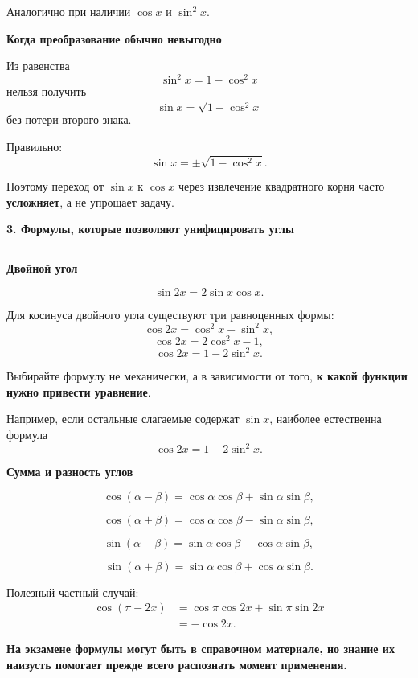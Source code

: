 \documentclass[a4paper,12pt]{article}
\newcommand{\checktitle}[1]{%
    \vspace{0.4em}
    {\Large\bfseries\textcolor{darkaccent}{#1}}\par
    \vspace{0.25em}
    {\color{accent!55}\rule{\linewidth}{0.6pt}}
    \vspace{0.45em}
}
\newcommand{\subcheck}[1]{%
    \vspace{0.25em}
    {\large\bfseries\textcolor{accent}{#1}}\par
    \vspace{0.15em}
}
\newcommand{\important}[1]{\textbf{\textcolor{darkaccent}{#1}}}
\begin{document}
Аналогично при наличии \(\cos x\) и \(\sin^2x\).

\subcheck{Когда преобразование обычно невыгодно}

Из равенства
\[
    \sin^2x=1-\cos^2x
\]
нельзя получить
\[
    \sin x=\sqrt{1-\cos^2x}
\]
без потери второго знака.

Правильно:
\[
    \sin x=\pm\sqrt{1-\cos^2x}.
\]

Поэтому переход от \(\sin x\) к \(\cos x\) через извлечение квадратного корня часто \important{усложняет}, а не упрощает задачу.


\checktitle{3. Формулы, которые позволяют унифицировать углы}

\subcheck{Двойной угол}

\[
    \sin2x=2\sin x\cos x.
\]

Для косинуса двойного угла существуют три равноценных формы:
\[
    \cos2x=\cos^2x-\sin^2x,
\]
\[
    \cos2x=2\cos^2x-1,
\]
\[
    \cos2x=1-2\sin^2x.
\]

Выбирайте формулу не механически, а в зависимости от того, \important{к какой функции нужно привести уравнение}.

Например, если остальные слагаемые содержат \(\sin x\), наиболее естественна формула
\[
    \cos2x=1-2\sin^2x.
\]

\subcheck{Сумма и разность углов}

\[
    \cos(\alpha-\beta)
    =
    \cos\alpha\cos\beta
    +
    \sin\alpha\sin\beta,
\]

\[
    \cos(\alpha+\beta)
    =
    \cos\alpha\cos\beta
    -
    \sin\alpha\sin\beta,
\]

\[
    \sin(\alpha-\beta)
    =
    \sin\alpha\cos\beta
    -
    \cos\alpha\sin\beta,
\]

\[
    \sin(\alpha+\beta)
    =
    \sin\alpha\cos\beta
    +
    \cos\alpha\sin\beta.
\]

Полезный частный случай:
\[
\begin{aligned}
    \cos(\pi-2x)
    &=
    \cos\pi\cos2x+\sin\pi\sin2x\\
    &=
    -\cos2x.
\end{aligned}
\]

\important{На экзамене формулы могут быть в справочном материале, но знание их наизусть помогает прежде всего распознать момент применения.}

\end{document}
